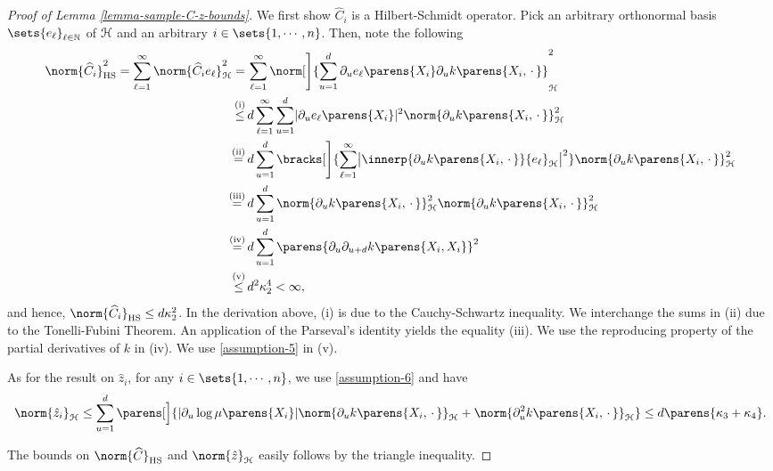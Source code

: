 \begin{proof}[Proof of Lemma \ref{lemma-sample-C-z-bounds}]
	We first show $\widehat{C}_i$ is a Hilbert-Schmidt operator. Pick an arbitrary orthonormal basis $\sets{e_\ell}_{\ell \in \Natural}$ of $\mathcal{H}$ and an arbitrary $i \in \sets{1, \cdots, n}$. Then, note the following 
	\begin{align*}
		\norm{\widehat{C}_i}_{\mathrm{HS}}^2 = \sum_{\ell=1}^{\infty} \norm{\widehat{C}_i e_{\ell}}_{\hil}^2 = & \, \sum_{\ell=1}^{\infty} \norm[\Bigg]{\sum_{u=1}^d \partial_u e_\ell \parens{X_i} \partial_u k \parens{X_i, \,\cdot\,} }_{\calH}^2 \\ 
		\stackrel{\text{(i)}}{\le} & \, d \sum_{\ell=1}^{\infty} \sum_{u=1}^d \abs{\partial_u e_\ell \parens{X_i}}^2 \norm{\partial_u k \parens{X_i, \,\cdot\,}}_{\calH}^2 \\ 
		\stackrel{\text{(ii)}}{=} & \, d \sum_{u=1}^d \bracks[\Bigg]{\sum_{\ell=1}^{\infty} \abs[\big]{\innerp{\partial_u k \parens{X_i, \,\cdot\,}}{e_\ell }_{\calH}}^2} \norm{\partial_u k \parens{X_i, \,\cdot\,}}_{\calH}^2 \\ 
		\stackrel{\text{(iii)}}{=} & \, d \sum_{u=1}^d \norm{\partial_u k \parens{X_i, \,\cdot\,} }_{\hil}^2 \norm{\partial_u k \parens{X_i, \,\cdot\,} }_{\calH}^2 \\ 
		\stackrel{\text{(iv)}}{=} & \, d \sum_{u=1}^d \parens{\partial_u \partial_{u+d} k \parens{X_i, X_i} }^2 \\ 
		\stackrel{\text{(v)}}{\le} & \, d^2 \kappa_2^4 < \infty, 
	\end{align*}
	and hence, $\norm{\widehat{C}_i}_{\mathrm{HS}} \le d \kappa_2^2$. In the derivation above, (i) is due to the Cauchy-Schwartz inequality. We interchange the sums in (ii) due to the Tonelli-Fubini Theorem. An application of the Parseval's identity yields the equality (iii). We use the reproducing property of the partial derivatives of $k$ in (iv). We use \ref{assumption-5} in (v). 

	As for the result on $\hat{z}_i$, for any $i \in \sets{1, \cdots, n}$, we use \ref{assumption-6} and have 
	\begin{align*}
		\norm{\hat{z}_i}_{\hil} \le \sum_{u=1}^d \parens[\Big]{\abs{\partial_u \log \mu \parens{X_i}} \norm{\partial_u k \parens{X_i, \,\cdot\,} }_{\calH} + \norm{\partial_u^2 k \parens{X_i, \,\cdot\,} }_{\hil}} \le d \parens{\kappa_3 + \kappa_4}. 
	\end{align*}
	
	The bounds on $\norm{\widehat{C}}_{\mathrm{HS}}$ and $\norm{\hat{z}}_{\calH}$ easily follows by the triangle inequality. 
\end{proof}

